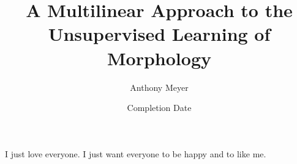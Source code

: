 \documentclass{iuphd}
\title{A Multilinear Approach to the Unsupervised Learning of Morphology}
\author{Anthony Meyer}
\date{Completion Date}
\begin{document}
\maketitle

\acceptancepage

\copyrightpage


\begin{acknowledgments}
I just love everyone. I just want everyone to be happy and to like me.
\end{acknowledgments}

\end{document}
